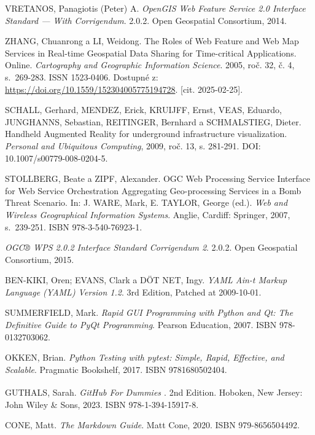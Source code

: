 \documentclass[a4paper,oneside,12pt]{book}
\begin{document}
\begin{thebibliography}{1}
VRETANOS, Panagiotis (Peter) A. \textit{OpenGIS Web Feature Service 2.0 Interface Standard --- With Corrigendum}. 2.0.2. Open Geospatial Consortium, 2014.

ZHANG, Chuanrong a LI, Weidong. The Roles of Web Feature and Web Map Services in Real-time Geospatial Data Sharing for Time-critical Applications. Online. \textit{Cartography and Geographic Information Science}. 2005, roč. 32, č. 4, s.~269-283. ISSN 1523-0406. Dostupné z: \url{https://doi.org/10.1559/152304005775194728}. [cit. 2025-02-25].

SCHALL, Gerhard, MENDEZ, Erick, KRUIJFF, Ernst, VEAS, Eduardo, JUNGHANNS, Sebastian, REITINGER, Bernhard a SCHMALSTIEG, Dieter.  
Handheld Augmented Reality for underground infrastructure visualization.  
\textit{Personal and Ubiquitous Computing}, 2009, roč. 13, s. 281-291.  
DOI: 10.1007/s00779-008-0204-5.  

STOLLBERG, Beate a ZIPF, Alexander. OGC Web Processing Service Interface for Web Service Orchestration Aggregating Geo-processing Services in a Bomb Threat Scenario. In: J. WARE, Mark, E. TAYLOR, George (ed.). \textit{Web and Wireless Geographical Information Systems}. Anglie, Cardiff: Springer, 2007, s.~239-251. ISBN 978-3-540-76923-1.

\textit{OGC® WPS 2.0.2 Interface Standard Corrigendum 2}. 2.0.2. Open Geospatial Consortium, 2015.

BEN-KIKI, Oren; EVANS, Clark a DÖT NET, Ingy. \textit{YAML Ain-t Markup Language (YAML) Version 1.2}. 3rd Edition, Patched at 2009-10-01.

SUMMERFIELD, Mark. \textit{Rapid GUI Programming with Python and Qt: The Definitive Guide to PyQt Programming}. Pearson Education, 2007. ISBN 978-0132703062.

OKKEN, Brian. \textit{Python Testing with pytest: Simple, Rapid, Effective, and Scalable}. Pragmatic Bookshelf, 2017. ISBN 9781680502404.

GUTHALS, Sarah. \textit{GitHub\texorpdfstring{\textsuperscript{\textregistered}}{ (R)} For Dummies \texorpdfstring{\textsuperscript{\textregistered}}{(R)}}. 2nd Edition. Hoboken, New Jersey: John Wiley \& Sons, 2023. ISBN 978-1-394-15917-8.

CONE, Matt. \textit{The Markdown Guide}. Matt Cone, 2020. ISBN 979-8656504492.


\end{thebibliography}
\end{document}
